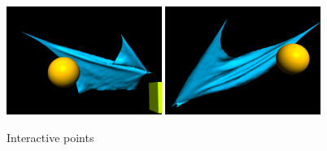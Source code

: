 \documentclass[acmtog]{acmart}
\begin{document}
\begin{figure}[H]
	\centering
	\includegraphics[width=0.45\textwidth]{images/4.png}
	\includegraphics[width=0.45\textwidth]{images/5.png}
	\caption{Interactive points}
\end{figure}
\end{document}
